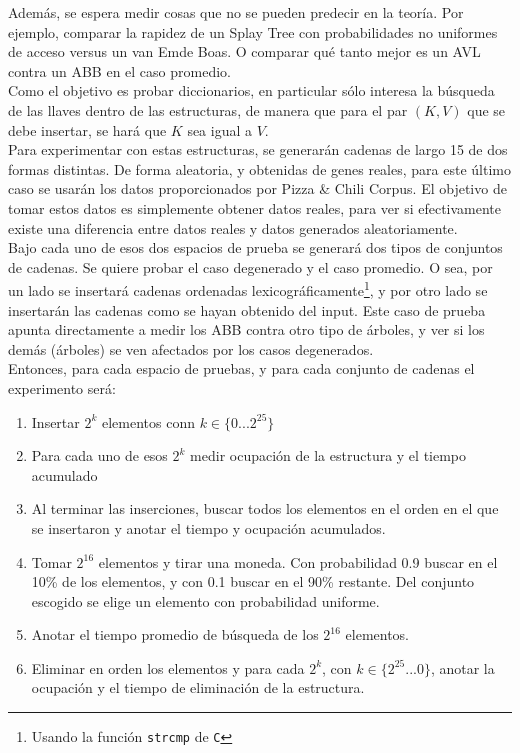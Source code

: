 \documentclass[12pt,letterpaper]{report}
\begin{document}
Además, se espera medir cosas que no se pueden predecir en la teoría. Por ejemplo, comparar la rapidez de un Splay Tree con probabilidades no uniformes de acceso versus un van Emde Boas. O comparar qué tanto mejor es un AVL contra un ABB en el caso promedio.\\

Como el objetivo es probar diccionarios, en particular sólo interesa la búsqueda de las llaves dentro de las estructuras, de manera que para el par $(K, V)$ que se debe insertar, se hará que $K$ sea igual a $V$.\\

Para experimentar con estas estructuras, se generarán cadenas de largo 15 de dos formas distintas. De forma aleatoria, y obtenidas de genes reales, para este último caso se usarán los datos proporcionados por Pizza \& Chili Corpus. El objetivo de tomar estos datos es simplemente obtener datos reales, para ver si efectivamente existe una diferencia entre datos reales y datos generados aleatoriamente.\\

Bajo cada uno de esos dos espacios de prueba se generará dos tipos de conjuntos de cadenas. Se quiere probar el caso degenerado y el caso promedio. O sea, por un lado se insertará cadenas ordenadas lexicográficamente\footnote{Usando la función \texttt{strcmp} de \texttt{C}}, y por otro lado se insertarán las cadenas como se hayan obtenido del input. Este caso de prueba apunta directamente a medir los ABB contra otro tipo de árboles, y ver si los demás (árboles) se ven afectados por los casos degenerados.\\

Entonces, para cada espacio de pruebas, y para cada conjunto de cadenas el experimento será:

\begin{enumerate}
\item Insertar $2^k$ elementos conn $k\in \{0 ... 2^{25}\}$
\item Para cada uno de esos $2^k$ medir ocupación de la estructura y el tiempo acumulado
\item Al terminar las inserciones, buscar todos los elementos en el orden en el que se insertaron y anotar el tiempo y ocupación acumulados.
\item Tomar $2^{16}$ elementos y tirar una moneda. Con probabilidad 0.9 buscar en el 10\% de los elementos, y con 0.1 buscar en el 90\% restante. Del conjunto escogido se elige un elemento con probabilidad uniforme.
\item Anotar el tiempo promedio de búsqueda de los $2^{16}$ elementos.
\item Eliminar en orden los elementos y para cada $2^k$, con $k\in \{2^{25} ... 0\}$, anotar la ocupación y el tiempo de eliminación de la estructura.
\end{enumerate}
\end{document}
